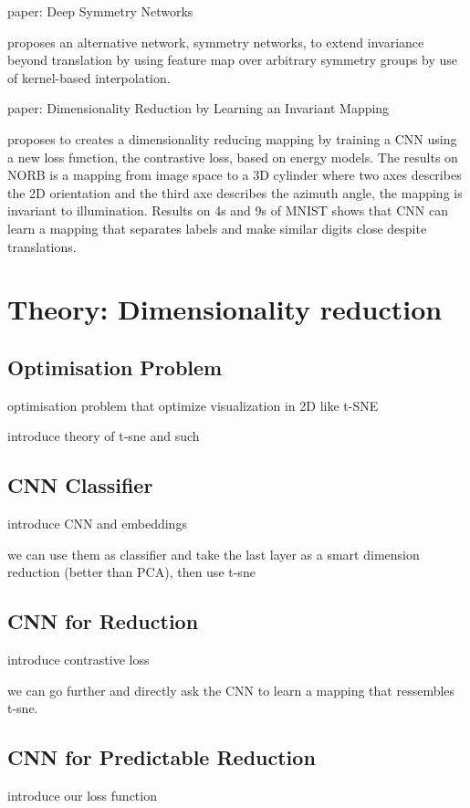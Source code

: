 \documentclass[a4paper,12pt]{report}
\begin{document}
paper: Deep Symmetry Networks

proposes an alternative network, symmetry networks, to extend invariance beyond translation by using feature map over arbitrary symmetry groups by use of kernel-based interpolation.

paper: Dimensionality Reduction by Learning an Invariant Mapping

proposes to creates a dimensionality reducing mapping by training a CNN using a new loss function, the contrastive loss, based on energy models. The results on NORB is a mapping from image space to a 3D cylinder where two axes describes the 2D orientation and the third axe describes the azimuth angle, the mapping is invariant to illumination. Results on 4s and 9s of MNIST shows that CNN can learn a mapping that separates labels and make similar digits close despite translations.

\chapter{Theory: Dimensionality reduction}

\section{Optimisation Problem}
optimisation problem that optimize visualization in 2D like t-SNE

introduce theory of t-sne and such

\section{CNN Classifier}
introduce CNN and embeddings

we can use them as classifier and take the last layer as a smart dimension reduction (better than PCA), then use t-sne

\section{CNN for Reduction}
introduce contrastive loss

we can go further and directly ask the CNN to learn a mapping that ressembles t-sne.

\section{CNN for Predictable Reduction}
introduce our loss function
\end{document}
